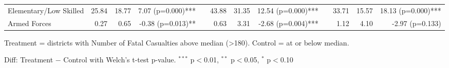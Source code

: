\begin{table}[htbp]
\begin{tabular}{l rrr c rrr c rrr}
\quad Elementary/Low Skilled & 25.84 & 18.77 & 7.07 (p=0.000)*** &  & 43.88 & 31.35 & 12.54 (p=0.000)*** &  & 33.71 & 15.57 & 18.13 (p=0.000)*** \\
\quad Armed Forces & 0.27 & 0.65 & -0.38 (p=0.013)** &  & 0.63 & 3.31 & -2.68 (p=0.004)*** &  & 1.12 & 4.10 & -2.97 (p=0.133) \\
\bottomrule
\end{tabular}
\begin{tablenotes}
\small
\item Treatment = districts with Number of Fatal Casualties above median (>180). Control = at or below median.
\item Diff: Treatment $-$ Control with Welch's t-test p-value. $^{{***}}$ p$<$0.01, $^{{**}}$ p$<$0.05, $^{{*}}$ p$<$0.10
\end{tablenotes}
\end{table}

\clearpage

